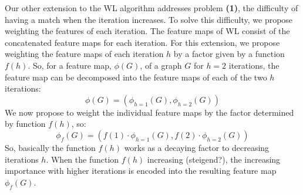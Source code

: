 Our other extension to the WL algorithm addresses problem \textbf{(1)}, the difficulty of having a match when the iteration increases.
To solve this difficulty, we propose weighting the features of each iteration.
The feature maps of WL consist of the concatenated feature maps for each iteration.
For this extension, we propose weighting the feature maps of each iteration $h$ by a factor given by a function $f(h)$.
So, for a feature map, $\phi(G)$, of a graph $G$ for $h=2$ iterations, the feature map can be decomposed into the feature maps of each of the two $h$ iterations:
\begin{equation*}
\phi(G)=(\phi_{h=1}(G), \phi_{h=2}(G))
\end{equation*}
We now propose to weight the individual feature maps by the factor determined by function $f(h)$, so:
\begin{equation*}
\phi_{f}(G)=(f(1) \cdot \phi_{h=1}(G), f(2) \cdot \phi_{h=2}(G))
\end{equation*}
So, basically the function $f(h)$ works as a decaying factor to decreasing iterations $h$.
When the function $f(h)$ increasing (steigend?), the increasing importance with higher iterations is encoded into the resulting feature map $\phi_f(G)$.

